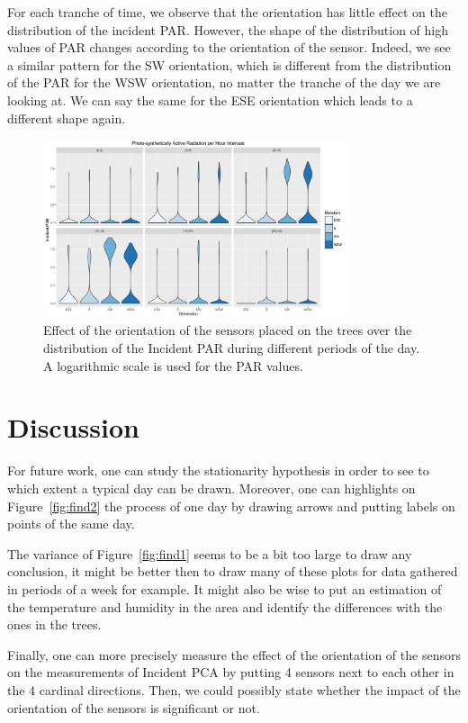 \documentclass[11pt]{article}\usepackage[]{graphicx}\usepackage[]{color}
\begin{document}
For each tranche of time, we observe that the orientation has little effect on the distribution of the incident PAR. However, the shape of the distribution of high values of PAR changes according to the orientation of the sensor. Indeed, we see a similar pattern for the SW orientation, which is different from the distribution of the PAR for the WSW orientation, no matter the tranche of the day we are looking at. We can say the same for the ESE orientation which leads to a different shape again.
\begin{figure}
  \centering
    \includegraphics[width=0.8\textwidth]{Find3}
  \caption{Effect of the orientation of the sensors placed on the trees over the distribution of the Incident PAR during  different periods of the day. A logarithmic scale is used for the PAR values.}
  \label{fig:find3}
\end{figure}


\section{Discussion}
For future work, one can study the stationarity hypothesis in order to see to which extent a typical day can be drawn. Moreover, one can highlights on Figure~\ref{fig:find2} the process of one day by drawing arrows and putting labels on points of the same day.

The variance of Figure~\ref{fig:find1} seems to be a bit too large to draw any conclusion, it might be better then to draw many of these plots for data gathered in periods of a week for example. It might also be wise to put an estimation of the temperature and humidity in the area and identify the differences with the ones in the trees. 

Finally, one can more precisely measure the effect of the orientation of the sensors on the measurements of Incident PCA by putting 4 sensors next to each other in the 4 cardinal directions. Then, we could possibly state whether the impact of the orientation of the sensors is significant or not.
\end{document}

